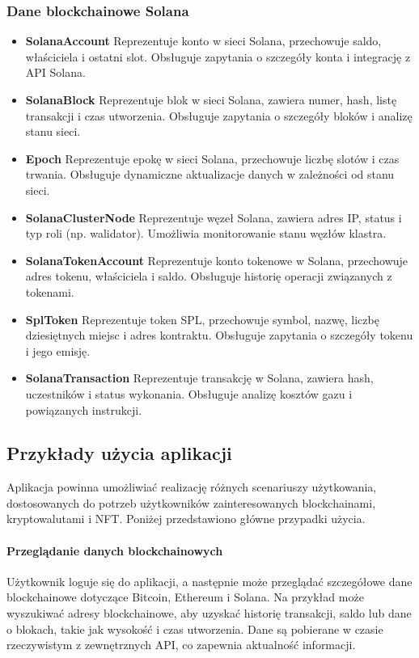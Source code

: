 \subsubsection{Dane blockchainowe Solana}
\begin{itemize}
\item \textbf{SolanaAccount} Reprezentuje konto w sieci Solana, przechowuje saldo, właściciela i ostatni slot. Obsługuje zapytania o szczegóły konta i integrację z API Solana.
\item \textbf{SolanaBlock} Reprezentuje blok w sieci Solana, zawiera numer, hash, listę transakcji i czas utworzenia. Obsługuje zapytania o szczegóły bloków i analizę stanu sieci.
\item \textbf{Epoch} Reprezentuje epokę w sieci Solana, przechowuje liczbę slotów i czas trwania. Obsługuje dynamiczne aktualizacje danych w zależności od stanu sieci.
\item \textbf{SolanaClusterNode} Reprezentuje węzeł Solana, zawiera adres IP, status i typ roli (np. walidator). Umożliwia monitorowanie stanu węzłów klastra.
\item \textbf{SolanaTokenAccount} Reprezentuje konto tokenowe w Solana, przechowuje adres tokenu, właściciela i saldo. Obsługuje historię operacji związanych z tokenami.
\item \textbf{SplToken} Reprezentuje token SPL, przechowuje symbol, nazwę, liczbę dziesiętnych miejsc i adres kontraktu. Obsługuje zapytania o szczegóły tokenu i jego emisję.
\item \textbf{SolanaTransaction} Reprezentuje transakcję w Solana, zawiera hash, uczestników i status wykonania. Obsługuje analizę kosztów gazu i powiązanych instrukcji.
\end{itemize}

\subsection{Przykłady użycia aplikacji}
Aplikacja powinna umożliwiać realizację różnych scenariuszy użytkowania, dostosowanych do potrzeb użytkowników zainteresowanych blockchainami, kryptowalutami i NFT. Poniżej przedstawiono główne przypadki użycia.

\paragraph{Przeglądanie danych blockchainowych}
Użytkownik loguje się do aplikacji, a następnie może przeglądać szczegółowe dane blockchainowe dotyczące Bitcoin, Ethereum i Solana. Na przykład może wyszukiwać adresy blockchainowe, aby uzyskać historię transakcji, saldo lub dane o blokach, takie jak wysokość i czas utworzenia. Dane są pobierane w czasie rzeczywistym z zewnętrznych API, co zapewnia aktualność informacji.

